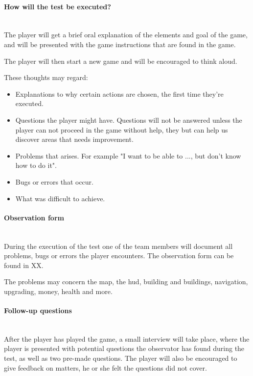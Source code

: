 \paragraph{How will the test be executed?}\mbox{}\\

The player will get a brief oral explanation of the elements and goal of the game, 
and will be presented with the game instructions that are found in the game.

The player will then start a new game and will be encouraged to think aloud. 

These thoughts may regard:

\begin{itemize}
  \item Explanations to why certain actions are chosen, the first time they're executed.
  \item Questions the player might have. Questions will not be answered unless the player can not proceed in the game without help, they but can help us discover areas that needs improvement.
  \item Problems that arises. For example "I want to be able to ..., but don't know how to do it". 
  \item Bugs or errors that occur.
  \item What was difficult to achieve.
\end{itemize}

\paragraph{Observation form}\mbox{}\\

During the execution of the test one of the team members will document all problems, bugs or errors the player encounters.
The observation form can be found in XX.

The problems may concern the map, the hud, building and buildings, navigation, upgrading, money, health and more.

\paragraph{Follow-up questions}\mbox{}\\

After the player has played the game, a small interview will take place, where the player is presented with potential questions the observator has found during the test, as well as two pre-made questions. The player will also be encouraged to give feedback on matters, he or she felt the questions did not cover.

